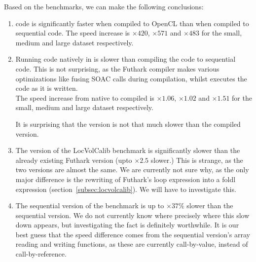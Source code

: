 Based on the benchmarks, we can make the following conclusions:
\begin{enumerate}
\item \fshark{} code is significantly faster when compiled to OpenCL than when
  compiled to sequential \csharp{} code. The speed increase is $\times 420$,
  $\times 571$ and $\times 483$ for the small, medium and large dataset respectively.

\item Running \fshark{} code natively in \fsharp{} is slower than compiling the
  \fshark{} code to sequential \csharp{} code.
  This is not surprising, as the Futhark compiler makes various optimizations like fusing SOAC calls during
  compilation, whilst \fsharp{} executes the code as it is written.\\
  The speed increase from native \fshark{} to compiled \fshark{} is $\times 1.06$,
  $\times 1.02$ and $\times 1.51$ for the small, medium and large dataset respectively.

  It is surprising that the \fsharp{} version is not that much slower than
  the compiled \csharp{} version.

\item The \fshark{} version of the LocVolCalib benchmark is significantly slower
  than the already existing Futhark version (upto $\times 2.5$ slower.)
  This is strange, as the two versions are almost the same. We are currently not
  sure why, as the only major difference is the rewriting of Futhark's loop
  expression into a foldl expression (section~\ref{subsec:locvolcalib}).
  We will have to investigate this.

\item The sequential \csharp{} version of the benchmark is up to $\times 37\%$ slower than
  the sequential \csharp{} version. We do not currently know where precisely
  where this slow down appears, but investigating the fact is definitely
  worthwhile. It is our best guess that the speed difference comes from the
  sequential version's array reading and writing functions, as these are
  currently call-by-value, instead of call-by-reference. 
\end{enumerate}

